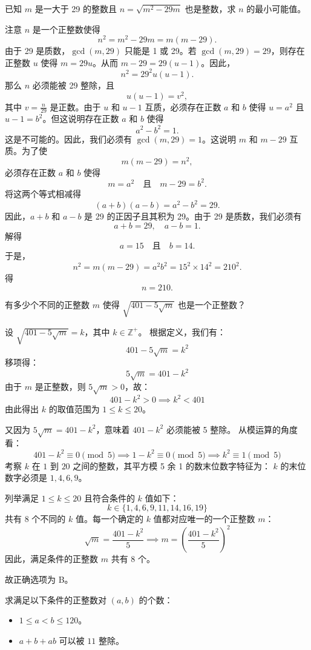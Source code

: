 \begin{questions}
\question 已知 $m$ 是一大于 29 的整数且 $n = \sqrt{m^2 - 29m}$ 也是整数，求 $n$ 的最小可能值。

\begin{solution}
注意 $n$ 是一个正整数使得
\[
n^2 = m^2 - 29m = m(m - 29).
\]
由于 29 是质数，$\gcd(m, 29)$ 只能是 1 或 29。若 $\gcd(m, 29) = 29$，则存在正整数 $u$ 使得 $m = 29u$。从而 $m - 29 = 29(u - 1)$。因此，
\[
n^2 = 29^2 u(u - 1).
\]
那么 $n$ 必须能被 29 整除，且
\[
u(u - 1) = v^2,
\]
其中 $v = \frac{n}{29}$ 是正数。由于 $u$ 和 $u - 1$ 互质，必须存在正数 $a$ 和 $b$ 使得 $u = a^2$ 且 $u - 1 = b^2$。但这说明存在正数 $a$ 和 $b$ 使得
\[
a^2 - b^2 = 1.
\]
这是不可能的。因此，我们必须有 $\gcd(m, 29) = 1$。这说明 $m$ 和 $m - 29$ 互质。为了使
\[
m(m - 29) = n^2,
\]
必须存在正数 $a$ 和 $b$ 使得
\[
m = a^2 \quad \text{且} \quad m - 29 = b^2.
\]
将这两个等式相减得
\[
(a + b)(a - b) = a^2 - b^2 = 29.
\]
因此，$a + b$ 和 $a - b$ 是 29 的正因子且其积为 29。由于 29 是质数，我们必须有
\[
a + b = 29, \quad a - b = 1.
\]
解得
\[
a = 15 \quad \text{且} \quad b = 14.
\]
于是，
\[
n^2 = m(m - 29) = a^2 b^2 = 15^2 \times 14^2 = 210^2.
\]
得
\[
n = 210.
\]
\end{solution}

\question 有多少个不同的正整数 $m$ 使得 $\sqrt{401 - 5\sqrt{m}}$ 也是一个正整数？

\begin{solution}
设 $\sqrt{401 - 5\sqrt{m}} = k$，其中 $k \in \mathbb{Z}^+$。
根据定义，我们有：
\[
401 - 5\sqrt{m} = k^2
\]
移项得：
\[
5\sqrt{m} = 401 - k^2
\]
由于 $m$ 是正整数，则 $5\sqrt{m} > 0$，故：
\[
401 - k^2 > 0 \implies k^2 < 401
\]
由此得出 $k$ 的取值范围为 $1 \le k \le 20$。

又因为 $5\sqrt{m} = 401 - k^2$，意味着 $401 - k^2$ 必须能被 5 整除。
从模运算的角度看：
\[
401 - k^2 \equiv 0 \pmod 5 \implies 1 - k^2 \equiv 0 \pmod 5 \implies k^2 \equiv 1 \pmod 5
\]
考察 $k$ 在 $1$ 到 $20$ 之间的整数，其平方模 5 余 1 的数末位数字特征为：
$k$ 的末位数字必须是 $1, 4, 6, 9$。

列举满足 $1 \le k \le 20$ 且符合条件的 $k$ 值如下：
\[
k \in \{1, 4, 6, 9, 11, 14, 16, 19\}
\]
共有 8 个不同的 $k$ 值。每一个确定的 $k$ 值都对应唯一的一个正整数 $m$：
\[
\sqrt{m} = \frac{401 - k^2}{5} \implies m = \left( \frac{401 - k^2}{5} \right)^2
\]
因此，满足条件的正整数 $m$ 共有 8 个。

故正确选项为 B。
\end{solution}

\question 求满足以下条件的正整数对 $(a, b)$ 的个数：
\begin{itemize}
    \item[(i)] $1 \le a < b \le 120$。
    \item[(ii)] $a + b + ab$ 可以被 $11$ 整除。
\end{itemize}


\end{questions}
